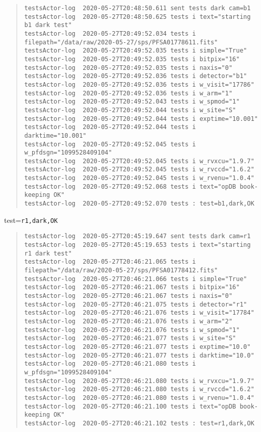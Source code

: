 \begin{quote}
\begin{tiny}
\begin{verbatim}
testsActor-log  2020-05-27T20:48:50.611 sent tests dark cam=b1
testsActor-log  2020-05-27T20:48:50.625 tests i text="starting b1 dark test"
testsActor-log  2020-05-27T20:49:52.034 tests i filepath="/data/raw/2020-05-27/sps/PFSA01778611.fits"
testsActor-log  2020-05-27T20:49:52.035 tests i simple="True"
testsActor-log  2020-05-27T20:49:52.035 tests i bitpix="16"
testsActor-log  2020-05-27T20:49:52.035 tests i naxis="0"
testsActor-log  2020-05-27T20:49:52.036 tests i detector="b1"
testsActor-log  2020-05-27T20:49:52.036 tests i w_visit="17786"
testsActor-log  2020-05-27T20:49:52.036 tests i w_arm="1"
testsActor-log  2020-05-27T20:49:52.043 tests i w_spmod="1"
testsActor-log  2020-05-27T20:49:52.044 tests i w_site="S"
testsActor-log  2020-05-27T20:49:52.044 tests i exptime="10.001"
testsActor-log  2020-05-27T20:49:52.044 tests i darktime="10.001"
testsActor-log  2020-05-27T20:49:52.045 tests i w_pfdsgn="1099528409104"
testsActor-log  2020-05-27T20:49:52.045 tests i w_rvxcu="1.9.7"
testsActor-log  2020-05-27T20:49:52.045 tests i w_rvccd="1.6.2"
testsActor-log  2020-05-27T20:49:52.045 tests i w_rvenu="1.0.4"
testsActor-log  2020-05-27T20:49:52.068 tests i text="opDB book-keeping OK"
testsActor-log  2020-05-27T20:49:52.070 tests : test=b1,dark,OK
\end{verbatim}
\end{tiny}
\end{quote}

\noindent test=\texttt{r1,dark,OK}

\begin{quote}
\begin{tiny}
\begin{verbatim}
testsActor-log  2020-05-27T20:45:19.647 sent tests dark cam=r1
testsActor-log  2020-05-27T20:45:19.653 tests i text="starting r1 dark test"
testsActor-log  2020-05-27T20:46:21.065 tests i filepath="/data/raw/2020-05-27/sps/PFSA01778412.fits"
testsActor-log  2020-05-27T20:46:21.066 tests i simple="True"
testsActor-log  2020-05-27T20:46:21.067 tests i bitpix="16"
testsActor-log  2020-05-27T20:46:21.067 tests i naxis="0"
testsActor-log  2020-05-27T20:46:21.075 tests i detector="r1"
testsActor-log  2020-05-27T20:46:21.076 tests i w_visit="17784"
testsActor-log  2020-05-27T20:46:21.076 tests i w_arm="2"
testsActor-log  2020-05-27T20:46:21.076 tests i w_spmod="1"
testsActor-log  2020-05-27T20:46:21.077 tests i w_site="S"
testsActor-log  2020-05-27T20:46:21.077 tests i exptime="10.0"
testsActor-log  2020-05-27T20:46:21.077 tests i darktime="10.0"
testsActor-log  2020-05-27T20:46:21.080 tests i w_pfdsgn="1099528409104"
testsActor-log  2020-05-27T20:46:21.080 tests i w_rvxcu="1.9.7"
testsActor-log  2020-05-27T20:46:21.080 tests i w_rvccd="1.6.2"
testsActor-log  2020-05-27T20:46:21.080 tests i w_rvenu="1.0.4"
testsActor-log  2020-05-27T20:46:21.100 tests i text="opDB book-keeping OK"
testsActor-log  2020-05-27T20:46:21.102 tests : test=r1,dark,OK
\end{verbatim}
\end{tiny}
\end{quote}

